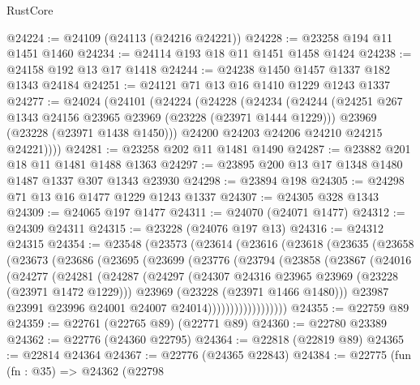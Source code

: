 \begin{lexlean}{RustCore}
\begin{coremodule}
@24224 := @24109 (@24113 (@24216 @24221))
@24228 := @23258 @194 @11 @1451 @1460
@24234 := @24114 @193 @18 @11 @1451 @1458 @1424
@24238 := @24158 @192 @13 @17 @1418
@24244 := @24238 @1450 @1457 @1337 @182 @1343 @24184
@24251 := @24121 @71 @13 @16 @1410 @1229 @1243 @1337
@24277 := @24024
    (@24101
      (@24224
        (@24228
          (@24234
            (@24244
              (@24251 @267 @1343 @24156 @23965 @23969 (@23228 (@23971 @1444 @1229)))
              @23969
              (@23228 (@23971 @1438 @1450)))
            @24200
            @24203
            @24206
            @24210
            @24215
            @24221))))
@24281 := @23258 @202 @11 @1481 @1490
@24287 := @23882 @201 @18 @11 @1481 @1488 @1363
@24297 := @23895 @200 @13 @17 @1348 @1480 @1487 @1337 @307 @1343 @23930
@24298 := @23894 @198
@24305 := @24298 @71 @13 @16 @1477 @1229 @1243 @1337
@24307 := @24305 @328 @1343
@24309 := @24065 @197 @1477
@24311 := @24070 (@24071 @1477)
@24312 := @24309 @24311
@24315 := @23228 (@24076 @197 @13)
@24316 := @24312 @24315
@24354 := @23548
    (@23573
      (@23614
        (@23616
          (@23618
            (@23635
              (@23658
                (@23673
                  (@23686
                    (@23695
                      (@23699
                        (@23776
                          (@23794
                            (@23858
                              (@23867
                                (@24016
                                  (@24277
                                    (@24281
                                      (@24287
                                        (@24297
                                          (@24307
                                            @24316
                                            @23965
                                            @23969
                                            (@23228 (@23971 @1472 @1229)))
                                          @23969
                                          (@23228 (@23971 @1466 @1480)))
                                        @23987
                                        @23991
                                        @23996
                                        @24001
                                        @24007
                                        @24014))))))))))))))))))
@24355 := @22759 @89
@24359 := @22761 (@22765 @89) (@22771 @89)
@24360 := @22780 @23389
@24362 := @22776 (@24360 @22795)
@24364 := @22818 (@22819 @89)
@24365 := @22814 @24364
@24367 := @22776 (@24365 @22843)
@24384 := @22775
    (fun (fn : @35) =>
    @24362
      (@22798

\end{coremodule}
\end{lexlean}
